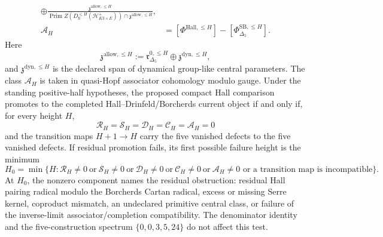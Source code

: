 \begin{theorem}
\[\begin{aligned}
 \oplus
 \frac{\mathfrak z^{\mathrm{allow},\leq H}}
 {\operatorname{Prim}Z(D^{\leq H}_\hbar(\mathcal H^+_{K3\times E}))
 \cap\mathfrak z^{\mathrm{allow},\leq H}},\\
 \mathcal A_H
 &=
 \left[\Phi^{\mathrm{Hall},\leq H}\right]
 -
 \left[\Phi^{\mathrm{SB},\leq H}_{\Delta_5}\right].
\end{aligned}
\]
Here
\[
 \mathfrak z^{\mathrm{allow},\leq H}
 :=
 \mathfrak r^{0,\leq H}_{\Delta_5}
 \oplus
 \mathfrak z^{\mathrm{dyn},\leq H},
\]
and \(\mathfrak z^{\mathrm{dyn},\leq H}\) is the declared span of
dynamical group-like central parameters. The class
\(\mathcal A_H\) is taken in quasi-Hopf associator cohomology modulo
gauge. Under the standing positive-half hypotheses, the
proposed compact Hall comparison promotes to the completed
Hall--Drinfeld/Borcherds current object if and only if, for every height
\(H\),
\[
 \mathcal R_H=\mathcal S_H=\mathcal D_H=\mathcal C_H=\mathcal A_H=0
\]
and the transition maps \(H+1\to H\) carry the five vanished defects to
the five vanished defects. If residual promotion fails, its first
possible failure height is the minimum
\[
 H_0
 =
\min\{H:\mathcal R_H\neq0\ \text{or}\ \mathcal S_H\neq0\
 \text{or}\ \mathcal D_H\neq0\ \text{or}\ \mathcal C_H\neq0\
 \text{or}\ \mathcal A_H\neq0
 \text{ or a transition map is incompatible}\}.
\]
At \(H_0\), the nonzero component names the residual obstruction:
residual Hall pairing radical modulo the Borcherds Cartan radical,
excess or missing Serre kernel, coproduct mismatch, an undeclared
primitive central class, or failure of the inverse-limit
associator/completion compatibility.
The denominator identity and the five-construction spectrum
\(\{0,0,3,5,24\}\) do not affect this test.
\end{theorem}


